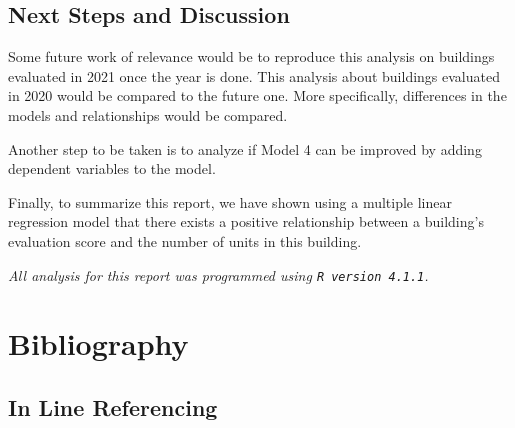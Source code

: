 \documentclass[
]{article}
\begin{document}
\hypertarget{next-steps-and-discussion}{%
\subsection{Next Steps and Discussion}\label{next-steps-and-discussion}}

Some future work of relevance would be to reproduce this analysis on
buildings evaluated in 2021 once the year is done. This analysis about
buildings evaluated in 2020 would be compared to the future one. More
specifically, differences in the models and relationships would be
compared.

Another step to be taken is to analyze if Model 4 can be improved by
adding dependent variables to the model.

Finally, to summarize this report, we have shown using a multiple linear
regression model that there exists a positive relationship between a
building's evaluation score and the number of units in this building.

\newpage

\emph{All analysis for this report was programmed using
\texttt{R\ version\ 4.1.1}.}

\hypertarget{bibliography}{%
\section{Bibliography}\label{bibliography}}

\hypertarget{in-line-referencing}{%
\subsection{In Line Referencing}\label{in-line-referencing}}
\end{document}

